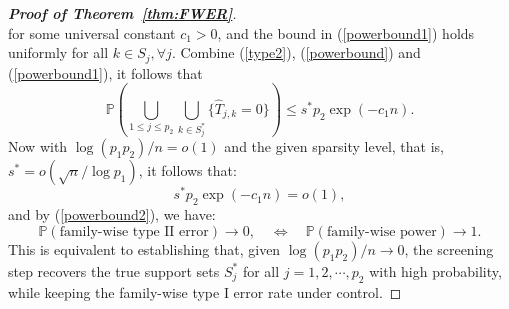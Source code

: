 \begin{proof}[\textbf{Proof of Theorem~\ref{thm:FWER}}]
\begin{equation}
\end{equation}
for some universal constant $c_1>0$, and the bound in (\ref{powerbound1}) holds uniformly for all $k\in S_j,\forall j$. Combine (\ref{type2}), (\ref{powerbound}) and (\ref{powerbound1}), it follows that 
\begin{equation}\label{powerbound2}
\mathbb{P}\left( \bigcup\limits_{1\leq j\leq p_2}\bigcup\limits_{k\in S^*_j}\{\widehat{T}_{j,k}=0\}\right) \leq s^*p_2 \exp(-c_1n).
\end{equation}
Now with $\log(p_1p_2)/n = o(1)$ and the given sparsity level, that is, $s^* = o(\sqrt{n}/\log p_1)$, it follows that:
	\begin{equation*}
	s^*p_2 \exp(-c_1n) = o(1),
	\end{equation*}
and by (\ref{powerbound2}), we have:
	\begin{equation*}
	\mathbb{P}\left(\text{family-wise type II error}\right) \rightarrow 0, \quad \Leftrightarrow \quad \mathbb{P}\left(\text{family-wise power}\right) \rightarrow 1.
	\end{equation*}
	This is equivalent to establishing that, given $\log(p_1p_2)/n\rightarrow 0$, the screening step recovers the true support sets $S_j^*$ for all $j=1,2,\cdots,p_2$ with high probability, while keeping the family-wise type I error rate under control. 
\end{proof}


